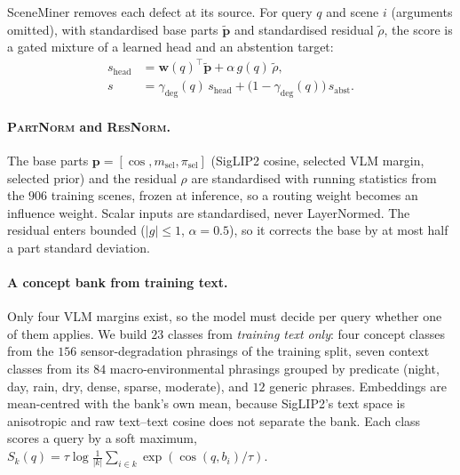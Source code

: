 \documentclass[10pt,twocolumn,letterpaper]{article}
\newcommand{\gdeg}{\gamma_{\mathrm{deg}}}
\begin{document}
SceneMiner removes each defect at its source. For query $q$ and scene $i$
(arguments omitted), with standardised base parts $\tilde{\mathbf{p}}$ and
standardised residual $\tilde\rho$, the score is a gated mixture of a learned head
and an abstention target:
\begin{align}
s_{\mathrm{head}} &= \mathbf{w}(q)^{\!\top}\tilde{\mathbf{p}}+\alpha\,g(q)\,\tilde\rho,\nonumber\\
s &= \gdeg(q)\,s_{\mathrm{head}}+\big(1-\gdeg(q)\big)\,s_{\mathrm{abst}}.
\label{eq:score}
\end{align}

\paragraph{\textsc{PartNorm} and \textsc{ResNorm}.} The base parts
$\mathbf{p}=[\cos, m_{\mathrm{sel}}, \pi_{\mathrm{sel}}]$ (SigLIP2 cosine, selected
VLM margin, selected prior) and the residual $\rho$ are standardised with running
statistics from the $906$ training scenes, frozen at inference, so a routing weight
becomes an influence weight. Scalar inputs are standardised, never LayerNormed. The
residual enters bounded ($|g|\le1$, $\alpha=0.5$), so it corrects the base by at
most half a part standard deviation.

\paragraph{A concept bank from training text.} Only four VLM margins exist, so the
model must decide per query whether one of them applies. We build $23$ classes from
\emph{training text only}: four concept classes from the $156$ sensor-degradation
phrasings of the training split, seven context classes from its $84$
macro-environmental phrasings grouped by predicate (night, day, rain, dry, dense,
sparse, moderate), and $12$ generic phrases. Embeddings are mean-centred with the
bank's own mean, because SigLIP2's text space is anisotropic and raw text--text
cosine does not separate the bank. Each class scores a query by a soft maximum,
$S_k(q)=\tau\log\frac{1}{|k|}\sum_{i\in k}\exp(\cos(q,b_i)/\tau)$.
\end{document}
